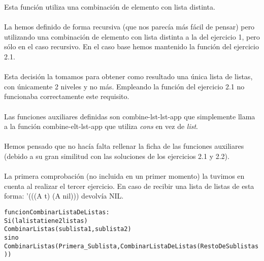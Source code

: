 \begin{aibox}{\comments}

Esta función utiliza una combinación de elemento con lista distinta. 
\paragraph{}
La hemos definido de forma recursiva (que nos parecía más fácil de pensar) pero utilizando una combinación de elemento con lista distinta a la del ejercicio 1, pero sólo en el caso recursivo. En el caso base hemos mantenido la función del ejercicio 2.1. 
\paragraph{}
Esta decisión la tomamos para obtener como resultado una única lista de listas, con únicamente 2 niveles y no más. Empleando la función del ejercicio 2.1 no funcionaba correctamente este requisito.
\paragraph{}
Las funciones auxiliares definidas son combine-lst-lst-app que simplemente llama a la función combine-elt-lst-app que utiliza \emph{cons} en vez de \emph{list}.
\paragraph{}
Hemos pensado que no hacía falta rellenar la ficha de las funciones auxiliares (debido a su gran similitud con las soluciones de los ejercicios 2.1 y 2.2).
\paragraph{}
La primera comprobación (no incluida en un primer momento) la tuvimos en cuenta al realizar el tercer ejercicio. En caso de recibir una lista de listas de esta forma: '(((A t) (A nil))) devolvía NIL.
\end{aibox}
\newpage
\begin{aibox}{\pseudocode}
\begin{alltt}
funcion CombinarListaDeListas:
    Si (la lista tiene 2 listas)
        CombinarListas(sublista1,sublista2)
    sino
        CombinarListas (Primera\_Sublista, CombinarListaDeListas (RestoDeSublistas))
\end{alltt}
\end{aibox}

